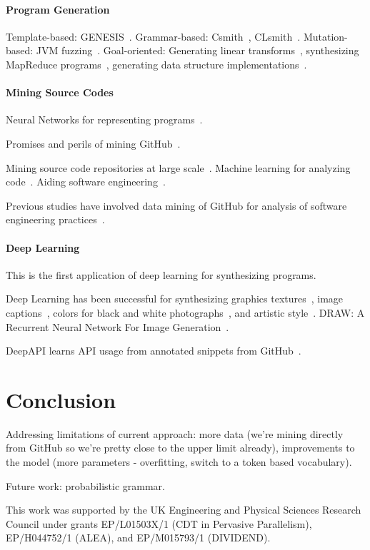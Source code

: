 \documentclass[preprint,nonatbib,10pt,nocopyrightspace]{sigplanconf}
\begin{document}
\paragraph{Program Generation} Template-based:
GENESIS~\cite{Chiu2015}.  Grammar-based: Csmith~\cite{Yang2012},
CLsmith~\cite{Pflanzer2016}. Mutation-based: JVM
fuzzing~\cite{Chena}. Goal-oriented: Generating linear
transforms~\cite{Voronenko2009}, synthesizing MapReduce
programs~\cite{Smith}, generating data structure
implementations~\cite{Loncaric2016}.


\paragraph{Mining Source Codes} Neural Networks for representing
programs~\cite{Bunel}.

Promises and perils of mining GitHub~\cite{Bird2009}.

Mining source code repositories at large
scale~\cite{Allamanis2013a,White2015a}. Machine learning for analyzing
code~\cite{Allamanis2014a,Raychev}. Aiding software
engineering~\cite{Allamanis2014,Bird2015}.

Previous studies have involved data mining of GitHub for analysis of
software engineering
practices~\cite{Wu2014,Guzman2014,Baishakhi2014a,Vasilescu2015}.


\paragraph{Deep Learning} This is the first application of deep
learning for synthesizing programs.

Deep Learning has been successful for synthesizing graphics
textures~\cite{Gatys2015a}, image captions~\cite{Vinyals}, colors for
black and white photographs~\cite{Zhang2016}, and artistic
style~\cite{Gatys2015}. DRAW: A Recurrent Neural Network For Image
Generation~\cite{Gregor2014}.


DeepAPI learns API usage from annotated snippets from
GitHub~\cite{Zhang2015a}.


\section{Conclusion}\label{sec:conclusion}

Addressing limitations of current approach: more data (we're mining
directly from GitHub so we're pretty close to the upper limit
already), improvements to the model (more parameters - overfitting,
switch to a token based vocabulary).

Future work: probabilistic grammar.


\acks

This work was supported by the UK Engineering and Physical Sciences
Research Council under grants EP/L01503X/1 (CDT in Pervasive
Parallelism), EP/H044752/1 (ALEA), and EP/M015793/1 (DIVIDEND).

\label{bibliography}
\printbibliography
\end{document}
